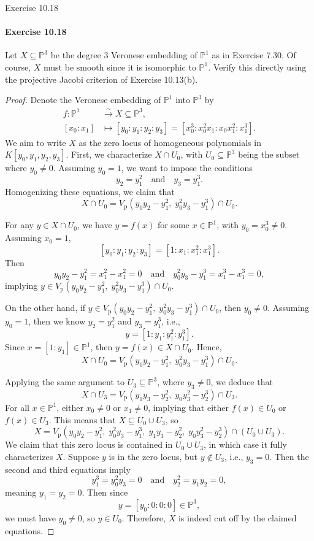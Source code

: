 \documentclass[12pt]{article}
\newenvironment{fullbox}{\begin{lrbox}{\savefullbox}\begin{minipage}{\dimexpr\textwidth-2\fboxsep\relax}}{\end{minipage}\end{lrbox}\begin{center}\framebox[\textwidth]{\usebox{\savefullbox}}\end{center}}
\newenvironment{pbox}[1][]{\begin{fullbox}\ifx#1\empty\else\paragraph{#1}\fi}{\end{fullbox}}
\newcommand{\isp}[1]{\quad\text{#1}\quad}
\newcommand{\<}{\langle}
\renewcommand{\>}{\rangle}
\renewcommand{\P}{\mathbb{P}}
\newcommand{\Vp}{V_{\mathrm{p}}}
\begin{document}
\newpage
\begin{pbox}[Exercise 10.18]
    Let $X \subseteq \P^3$ be the degree $3$ Veronese embedding of $\P^1$ as in Exercise 7.30. Of course, $X$ must be smooth since it is isomorphic to $\P^1$. Verify this directly using the projective Jacobi criterion of Exercise 10.13(b). 
\end{pbox}

\begin{proof}
    Denote the Veronese embedding of $\P^1$ into $\P^3$ by
    \begin{align*}
        f : \P^1 &\xrightarrow{\sim} X \subseteq \P^3, \\
            [x_0 : x_1] &\mapsto [y_0 : y_1 : y_2 : y_3] = [x_0^3 : x_0^2x_1 : x_0x_1^2 : x_1^3].
    \end{align*}
    We aim to write $X$ as the zero locus of homogeneous polynomials in $K[y_0, y_1, y_2, y_3]$. First, we characterize $X \cap U_0$, with $U_0 \subseteq \P^3$ being the subset where $y_0 \ne 0$. Assuming $y_0 = 1$, we want to impose the conditions
    \[
        y_2 = y_1^2 \isp{and} y_3 = y_1^3.
    \]
    Homogenizing these equations, we claim that
    \[
        X \cap U_0 = \Vp(y_0y_2 - y_1^2,\; y_0^2y_3 - y_1^3) \cap U_0.
    \]

    For any $y \in X \cap U_0$, we have $y = f(x)$ for some $x \in \P^1$, with $y_0 = x_0^3 \ne 0$. Assuming $x_0 = 1$,
    \[
        [y_0 : y_1 : y_2 : y_3] = [1 : x_1 : x_1^2 : x_1^3].
    \]
    Then
    \[
        y_0y_2 - y_1^2 = x_1^2 - x_1^2 = 0 \isp{and} y_0^2y_3 - y_1^3 = x_1^3 - x_1^3 = 0,
    \]
    implying $y \in \Vp(y_0y_2 - y_1^2,\; y_0^2y_3 - y_1^3) \cap U_0$.

    On the other hand, if $y \in \Vp(y_0y_2 - y_1^2,\; y_0^2y_3 - y_1^3) \cap U_0$, then $y_0 \ne 0$. Assuming $y_0 = 1$, then we know $y_2 = y_1^2$ and $y_3 = y_1^3$, i.e.,
    \[
        y = [1 : y_1 : y_1^2 : y_1^3].
    \]
    Since $x = [1 : y_1] \in \P^1$, then $y = f(x) \in X \cap U_0$. Hence,
    \[
        X \cap U_0 = \Vp(y_0y_2 - y_1^2,\; y_0^2y_3 - y_1^3) \cap U_0.
    \]

    Applying the same argument to $U_3 \subseteq \P^3$, where $y_3 \ne 0$, we deduce that
    \[
        X \cap U_3 = \Vp(y_1y_3 - y_2^2,\; y_0y_3^2 - y_2^3) \cap U_3.
    \]
    For all $x \in \P^1$, either $x_0 \ne 0$ or $x_1 \ne 0$, implying that either $f(x) \in U_0$ or $f(x) \in U_3$. This means that $X \subseteq U_0 \cup U_3$, so
    \[
        X = \Vp(y_0y_2 - y_1^2,\; y_0^2y_3 - y_1^3,\; y_1y_3 - y_2^2,\; y_0y_3^2 - y_2^3) \cap (U_0 \cup U_3).
    \]
    We claim that this zero locus is contained in $U_0 \cup U_3$, in which case it fully characterizes $X$. Suppose $y$ is in the zero locus, but $y \notin U_3$, i.e., $y_3 = 0$. Then the second and third equations imply
    \[
        y_1^3 = y_0^2y_3 = 0 \isp{and} y_2^2 = y_1y_2 = 0,
    \]
    meaning $y_1 = y_2 = 0$. Then since
    \[
        y = [y_0 : 0 : 0 : 0] \in \P^3,
    \]
    we must have $y_0 \ne 0$, so $y \in U_0$. Therefore, $X$ is indeed cut off by the claimed equations.


\end{proof}
\end{document}
